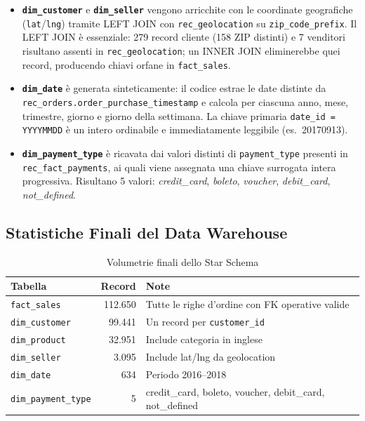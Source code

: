 \documentclass[12pt,a4paper]{article}
\begin{document}
\begin{itemize}
  \item \textbf{\texttt{dim\_customer}} e \textbf{\texttt{dim\_seller}} vengono
        arricchite con le coordinate geografiche (\texttt{lat}/\texttt{lng})
        tramite LEFT JOIN con \texttt{rec\_geolocation} su
        \texttt{zip\_code\_prefix}. Il LEFT JOIN è essenziale: 279 record cliente
        (158 ZIP distinti) e 7 venditori risultano assenti in \texttt{rec\_geolocation}; un INNER
        JOIN eliminerebbe quei record, producendo chiavi orfane in
        \texttt{fact\_sales}.

  \item \textbf{\texttt{dim\_date}} è generata sinteticamente: il codice estrae le
        date distinte da \texttt{rec\_orders.order\_purchase\_timestamp} e calcola
        per ciascuna anno, mese, trimestre, giorno e giorno della settimana. La
        chiave primaria \texttt{date\_id = YYYYMMDD} è un intero ordinabile e
        immediatamente leggibile (es.\ 20170913).

  \item \textbf{\texttt{dim\_payment\_type}} è ricavata dai valori distinti di
        \texttt{payment\_type} presenti in \texttt{rec\_fact\_payments}, ai quali
        viene assegnata una chiave surrogata intera progressiva. Risultano 5 valori:
        \textit{credit\_card}, \textit{boleto}, \textit{voucher},
        \textit{debit\_card}, \textit{not\_defined}.
\end{itemize}

\subsection{Statistiche Finali del Data Warehouse}

\begin{table}[H]
  \centering
  \caption{Volumetrie finali dello Star Schema}
  \label{tab:volumes}
  \begin{tabular}{lrl}
    \toprule
    \textbf{Tabella} & \textbf{Record} & \textbf{Note} \\
    \midrule
    \texttt{fact\_sales}        & 112.650 & Tutte le righe d'ordine con FK operative valide \\
    \texttt{dim\_customer}      &  99.441 & Un record per \texttt{customer\_id} \\
    \texttt{dim\_product}       &  32.951 & Include categoria in inglese \\
    \texttt{dim\_seller}        &   3.095 & Include lat/lng da geolocation \\
    \texttt{dim\_date}          &     634 & Periodo 2016--2018 \\
    \texttt{dim\_payment\_type} &       5 & credit\_card, boleto, voucher, debit\_card, not\_defined \\
    \bottomrule
  \end{tabular}
\end{table}
\end{document}
